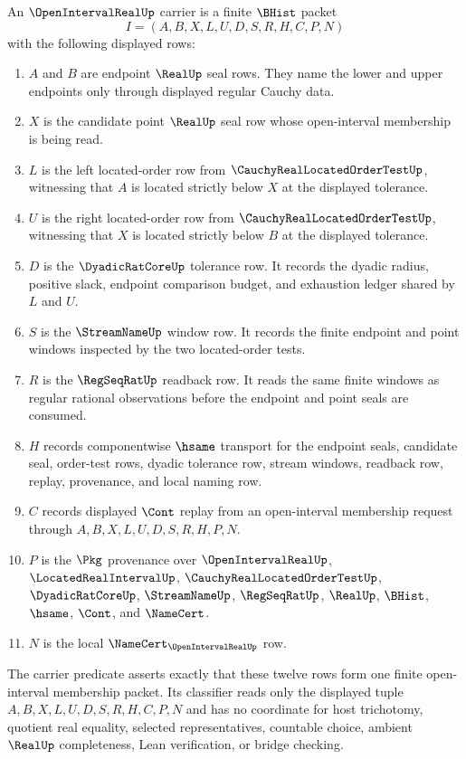 \begin{definition}
\label{def:open-interval-real-carrier}
An $\OpenIntervalRealUp$ carrier is a finite $\BHist$ packet
$$
I=(A,B,X,L,U,D,S,R,H,C,P,N)
$$
with the following displayed rows:
\begin{enumerate}
\item $A$ and $B$ are endpoint $\RealUp$ seal rows. They name the lower and upper endpoints only through displayed regular Cauchy data.
\item $X$ is the candidate point $\RealUp$ seal row whose open-interval membership is being read.
\item $L$ is the left located-order row from $\CauchyRealLocatedOrderTestUp$, witnessing that $A$ is located strictly below $X$ at the displayed tolerance.
\item $U$ is the right located-order row from $\CauchyRealLocatedOrderTestUp$, witnessing that $X$ is located strictly below $B$ at the displayed tolerance.
\item $D$ is the $\DyadicRatCoreUp$ tolerance row. It records the dyadic radius, positive slack, endpoint comparison budget, and exhaustion ledger shared by $L$ and $U$.
\item $S$ is the $\StreamNameUp$ window row. It records the finite endpoint and point windows inspected by the two located-order tests.
\item $R$ is the $\RegSeqRatUp$ readback row. It reads the same finite windows as regular rational observations before the endpoint and point seals are consumed.
\item $H$ records componentwise $\hsame$ transport for the endpoint seals, candidate seal, order-test rows, dyadic tolerance row, stream windows, readback row, replay, provenance, and local naming row.
\item $C$ records displayed $\Cont$ replay from an open-interval membership request through $A,B,X,L,U,D,S,R,H,P,N$.
\item $P$ is the $\Pkg$ provenance over $\OpenIntervalRealUp$, $\LocatedRealIntervalUp$, $\CauchyRealLocatedOrderTestUp$, $\DyadicRatCoreUp$, $\StreamNameUp$, $\RegSeqRatUp$, $\RealUp$, $\BHist$, $\hsame$, $\Cont$, and $\NameCert$.
\item $N$ is the local $\NameCert_{\OpenIntervalRealUp}$ row.
\end{enumerate}
The carrier predicate asserts exactly that these twelve rows form one finite open-interval membership packet. Its classifier reads only the displayed tuple $A,B,X,L,U,D,S,R,H,C,P,N$ and has no coordinate for host trichotomy, quotient real equality, selected representatives, countable choice, ambient $\RealUp$ completeness, Lean verification, or bridge checking.
\end{definition}

